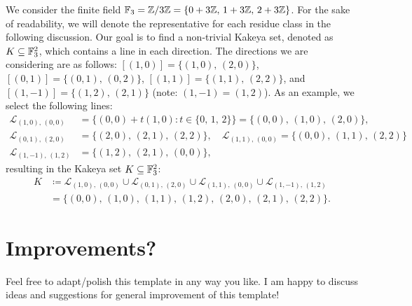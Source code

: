 \documentclass{scrartcl}
\newcommand{\fline}{\mathcal{L}} %
\begin{document}
\begin{example}\label{ex:kakeya-set}
	We consider the finite field $\mathbb{F}_3 = \mathbb{Z}/3\mathbb{Z} = \{ 0+3\mathbb{Z},\, 1+3\mathbb{Z},\, 2+3\mathbb{Z} \}$. 
	For the sake of readability, we will denote the representative for each residue class in the following discussion. 
	Our goal is to find a non-trivial Kakeya set, denoted as $K \subseteq \mathbb{F}_3^2$, which contains a line in each direction. 
	The directions we are considering are as follows:  $\left[ (1,0) \right] = \{ (1,0),\, (2,0) \}$, 
	$\left[ (0,1) \right] = \{ (0,1),\, (0,2) \}$, $\left[ (1,1) \right] = \{ (1,1),\, (2,2) \}$, and 
	$\left[ (1,-1) \right] = \{ (1,2),\, (2,1) \}$ (note: $(1,-1) = (1,2)$). 
	As an example, we select the following lines:
	\begin{align*}
		\fline_{(1,0),\, (0,0)} &= \{ (0,0) + t(1,0) : t \in \{0,\, 1, \, 2\} \} = \{ (0,0),\, (1,0),\, (2,0) \}, \\
		\fline_{(0,1),\, (2,0)} &= \{ (2,0),\, (2,1),\, (2,2) \}, \quad \fline_{(1,1),\, (0,0)} = \{ (0,0),\, (1,1),\, (2,2) \} \\
		\fline_{(1,-1),\, (1,2)} &= \{ (1,2),\, (2,1),\, (0,0) \},
	\end{align*}
	resulting in the Kakeya set $K \subseteq \mathbb{F}_3^2$:
	\begin{align*}
		K &\coloneqq \fline_{(1,0),\, (0,0)} \cup \fline_{(0,1),\, (2,0)} \cup \fline_{(1,1),\, (0,0)} \cup \fline_{(1,-1),\, (1,2)} \\
		&= \{ (0,0),\, (1,0),\, (1,1),\, (1,2),\, (2,0),\, (2,1),\, (2,2) \}.
	\end{align*}
\end{example}



\section{Improvements?}
\label{sec:improv}
Feel free to adapt/polish this template in any way you like. I am happy to discuss ideas and suggestions for general improvement of this template!

\printbibliography
\end{document}
